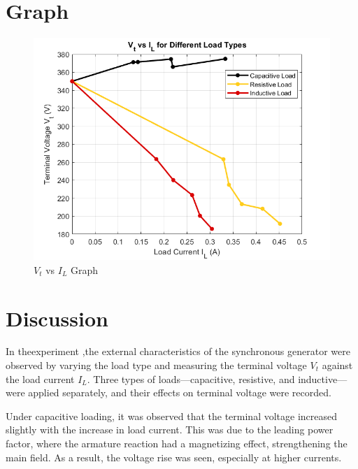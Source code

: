 \documentclass[a4paper,12pt]{article}
\begin{document}
	
	
	
	\newpage
	
	
	
	
	\section{Graph}
	\begin{figure}[H]
		\centering
		
			\centering
			\includegraphics[width=.94\linewidth]{Images/1}
			\caption{$V_{t}$ vs $I_L$ Graph }
			
	
		
	
	\end{figure}
	
	\section{Discussion}
	
	

In theexperiment ,the external characteristics of the synchronous generator were observed by varying the load type and measuring the terminal voltage \( V_t \) against the load current \( I_L \). Three types of loads—capacitive, resistive, and inductive—were applied separately, and their effects on terminal voltage were recorded.

Under capacitive loading, it was observed that the terminal voltage increased slightly with the increase in load current. This was due to the leading power factor, where the armature reaction had a magnetizing effect, strengthening the main field. As a result, the voltage rise was seen, especially at higher currents.
\end{document}

